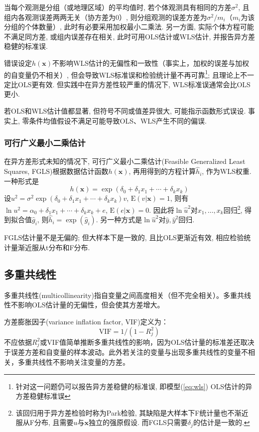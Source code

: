 \par 当每个观测是分组（或地理区域）的平均值时, 若个体观测具有相同的方差$\sigma^2$, 且组内各观测误差两两无关（协方差为0）, 则分组观测的误差方差为$\sigma^2/m_i$（$m_i$为该分组的个体数量）, 此时有必要采用加权最小二乘法. 另一方面, 实际个体方程可能不满足同方差, 或组内误差存在相关, 此时可用OLS估计或WLS估计, 并报告异方差稳健的标准误. 

\par 错误设定$h(\mathbf{x})$不影响WLS估计的无偏性和一致性（事实上，加权的误差与加权的自变量仍不相关）, 但会导致WLS标准误和检验统计量不再可靠\footnote{针对这一问题仍可以报告异方差稳健的标准误, 即模型(\ref{eq:wls}) OLS估计的异方差稳健标准误}; 且理论上不一定比OLS更有效. 但实践中在异方差性较严重的情况下, WLS标准误通常会比OLS更小. 

\par 若OLS和WLS估计值都显著, 但符号不同或值差异很大, 可能指示函数形式误设. 事实上, 零条件均值假设不满足可能导致OLS、WLS产生不同的偏误. 

\subsubsection{可行广义最小二乘估计}

\par 在异方差形式未知的情况下, 可行广义最小二乘估计(Feasible Generalized Least Squares, FGLS)根据数据估计函数$h(\mathbf{x})$, 再用得到的方程计算$\hat{h}_i$, 作为WLS权重. 一种形式是
\begin{equation}
h(\mathbf{x})=\exp(\delta_0+\delta_1x_1+\cdots +\delta_kx_k)
\end{equation}
设$u^2=\sigma^2 \exp(\delta_0+\delta_1x_1+\cdots +\delta_kx_k)v$, $\mathrm{E}(v\vert \mathbf{x})=1$, 则有$\ln u^2=\alpha_0+\delta_1x_1+\cdots +\delta_kx_k+e$, $\mathrm{E}(e\vert \mathbf{x})=0$. 因此将$\ln \hat{u}^2$对$x_1,\dots,x_k$回归\footnote{该回归用于异方差检验时称为Park检验, 其缺陷是大样本下F统计量也不渐近服从F分布, 且需要$u$与$\mathbf{x}$独立的强原假设. 而FGLS只需要$\delta_j$的估计是一致的. }, 得到拟合值$\hat{g}_i$, 则$\hat{h}_i=\exp(\hat{g}_i)$. 另一种方式是$\ln \hat{u}^2$对$\hat{y}, \hat{y}^2$回归. 
\par FGLS估计量不是无偏的; 但大样本下是一致的, 且比OLS更渐近有效, 相应检验统计量渐近服从t分布和F分布. 

\subsection{多重共线性}

\par 多重共线性(multicollinearity)指自变量之间高度相关（但不完全相关）。多重共线性不影响OLS估计量的无偏性，但会使其方差增大。
\par 方差膨胀因子(variance inflation factor, VIF)定义为：
\begin{equation}
    \text{VIF}=1/(1-R_j^2)
\end{equation}
不应依据$R^2_j$或VIF值简单推断多重共线性的影响，因为OLS估计量的标准差还取决于误差方差和自变量的样本波动。此外若关注的变量与出现多重共线性的变量不相关，多重共线性不影响关注变量的方差。

